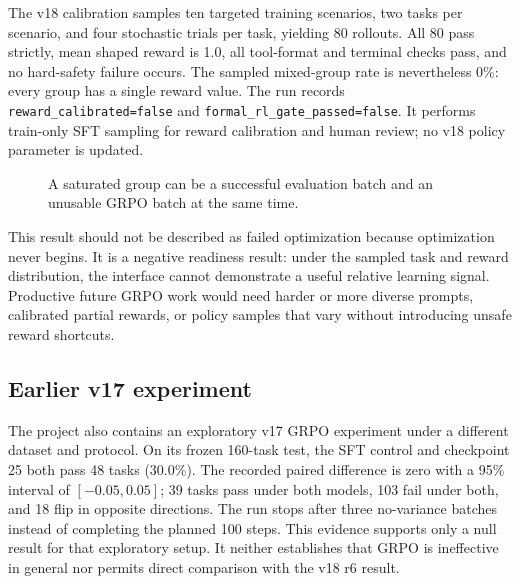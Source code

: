 \documentclass[11pt]{article}
\begin{document}
The v18 calibration samples ten targeted training scenarios, two tasks per scenario, and four stochastic trials per task, yielding 80 rollouts. All 80 pass strictly, mean shaped reward is 1.0, all tool-format and terminal checks pass, and no hard-safety failure occurs. The sampled mixed-group rate is nevertheless 0\%: every group has a single reward value. The run records \texttt{reward\_calibrated=false} and \texttt{formal\_rl\_gate\_passed=false}. It performs train-only SFT sampling for reward calibration and human review; no v18 policy parameter is updated.

\begin{figure}[t]
\centering
{}
\caption{A saturated group can be a successful evaluation batch and an unusable GRPO batch at the same time.}
\label{fig:grpo}
\end{figure}

This result should not be described as failed optimization because optimization never begins. It is a negative readiness result: under the sampled task and reward distribution, the interface cannot demonstrate a useful relative learning signal. Productive future GRPO work would need harder or more diverse prompts, calibrated partial rewards, or policy samples that vary without introducing unsafe reward shortcuts.

\subsection{Earlier v17 experiment}

The project also contains an exploratory v17 GRPO experiment under a different dataset and protocol. On its frozen 160-task test, the SFT control and checkpoint 25 both pass 48 tasks (30.0\%). The recorded paired difference is zero with a 95\% interval of $[-0.05,0.05]$; 39 tasks pass under both models, 103 fail under both, and 18 flip in opposite directions. The run stops after three no-variance batches instead of completing the planned 100 steps. This evidence supports only a null result for that exploratory setup. It neither establishes that GRPO is ineffective in general nor permits direct comparison with the v18 r6 result.
\end{document}
